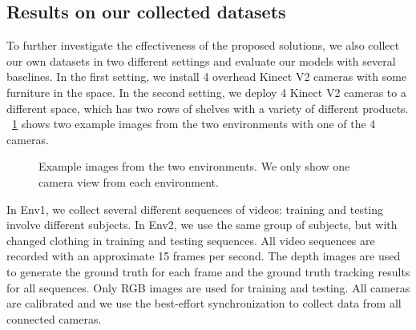 \documentclass{article}
\begin{document}
\subsection{Results on our collected datasets}
To further investigate the effectiveness of the proposed solutions, we also collect our own datasets in two different settings and evaluate our models with several baselines.
In the first setting, we install 4 overhead Kinect V2 cameras with some furniture in the space. In
the second setting, we deploy 4 Kinect V2 cameras to a different space, which has two rows of shelves with a variety of different products.
\figurename{~\ref{fig:studiox}} shows two example images from the two environments with one of the 4 cameras.

\begin{figure}[!htbp]
	\begin{center}
	\end{center}
	\caption{Example images from the two environments. We only show one camera view from each environment.}
	\label{fig:studiox}
\end{figure}

In Env1, we collect several different sequences of videos: training and testing involve different subjects. 
In Env2, we use the same group of subjects, but with changed clothing in training and testing sequences.
All video sequences are recorded with an approximate 15 frames per second. The depth images are used to generate the ground truth for each frame and the ground truth tracking results for all
sequences.
Only RGB images are used for training and testing. All cameras are calibrated and we use the best-effort synchronization to collect data from all connected cameras. 
\end{document}
